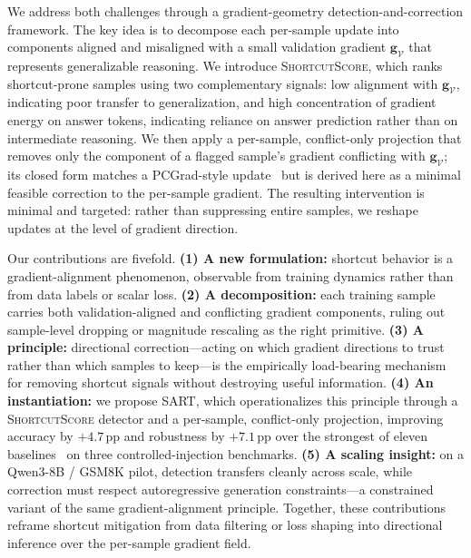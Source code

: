We address both challenges through a gradient-geometry detection-and-correction framework. The key idea is to decompose each per-sample update into components aligned and misaligned with a small validation gradient $\mathbf{g}_{\mathcal{V}}$ that represents generalizable reasoning. We introduce \textsc{ShortcutScore}, which ranks shortcut-prone samples using two complementary signals: low alignment with $\mathbf{g}_{\mathcal{V}}$, indicating poor transfer to generalization, and high concentration of gradient energy on answer tokens, indicating reliance on answer prediction rather than on intermediate reasoning. We then apply a per-sample, conflict-only projection that removes only the component of a flagged sample's gradient conflicting with $\mathbf{g}_{\mathcal{V}}$; its closed form matches a PCGrad-style update~\cite{yu2020gradient} but is derived here as a minimal feasible correction to the per-sample gradient. The resulting intervention is minimal and targeted: rather than suppressing entire samples, we reshape updates at the level of gradient direction.

Our contributions are fivefold. \textbf{(1) A new formulation:} shortcut behavior is a gradient-alignment phenomenon, observable from training dynamics rather than from data labels or scalar loss. \textbf{(2) A decomposition:} each training sample carries both validation-aligned and conflicting gradient components, ruling out sample-level dropping or magnitude rescaling as the right primitive. \textbf{(3) A principle:} directional correction---acting on which gradient directions to trust rather than which samples to keep---is the empirically load-bearing mechanism for removing shortcut signals without destroying useful information. \textbf{(4) An instantiation:} we propose SART, which operationalizes this principle through a \textsc{ShortcutScore} detector and a per-sample, conflict-only projection, improving accuracy by $+4.7$\,pp and robustness by $+7.1$\,pp over the strongest of eleven baselines~\cite{sagawa2020distributionallyrobustneuralnetworks,arjovsky2020invariantriskminimization} on three controlled-injection benchmarks. \textbf{(5) A scaling insight:} on a Qwen3-8B / GSM8K pilot, detection transfers cleanly across scale, while correction must respect autoregressive generation constraints---a constrained variant of the same gradient-alignment principle. Together, these contributions reframe shortcut mitigation from data filtering or loss shaping into directional inference over the per-sample gradient field.
\fi


